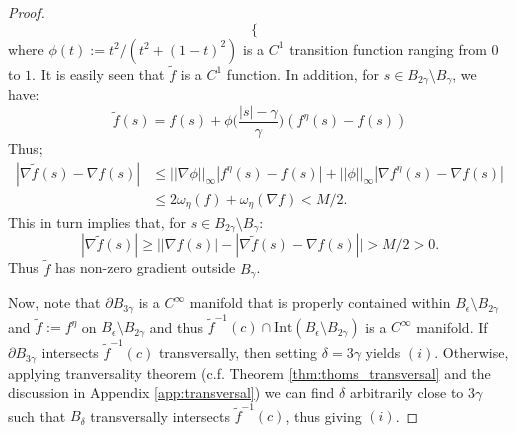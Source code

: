 \documentclass[11pt]{article}
\newcommand{\1}{\mathbf{1}}
\theoremstyle{definition}
\theoremstyle{remark}
\begin{document}
\begin{proof}
\begin{equation}
\begin{cases}
        \end{cases}        
    \end{equation}
    where $\phi(t):=t^2/(t^2+(1-t)^2)$ is a $C^1$ transition function ranging from $0$ to $1$. It is easily seen that $\tilde{f}$ is a $C^1$ function. In addition, for $s\in B_{2\gamma}\setminus B_{\gamma}$, we have:
    \begin{equation}\nonumber
        \tilde{f}(s) = f(s) + \phi\bigg(\frac{|s|-\gamma}{\gamma}\bigg)(f^\eta(s)-f(s)) 
    \end{equation}
    Thus;
    \begin{equation}\nonumber
    \begin{split}
        |\nabla \tilde{f}(s) - \nabla f(s)| & \leq ||\nabla \phi||_\infty|f^\eta(s)-f(s)|+||\phi||_\infty|\nabla f^\eta(s)-\nabla f(s)| \\ & \leq 2\omega_\eta(f) + \omega_\eta (\nabla f)<M/2.
    \end{split}
    \end{equation}
    This in turn implies that, for $s\in B_{2\gamma}\setminus B_{\gamma}$:
    \begin{equation}\nonumber
        |\nabla \tilde{f}(s)| \geq \bigg| |\nabla f(s)| - |\nabla \tilde{f}(s)-\nabla f(s)|\bigg| > M/2 > 0.
    \end{equation}
    Thus $\tilde{f}$ has non-zero gradient outside $B_\gamma$.
    
    Now, note that $\partial B_{3\gamma}$ is a $C^\infty$ manifold that is properly contained within $B_{\epsilon}\setminus B_{2\gamma}$ and $\tilde{f}:=f^\eta$ on $B_{\epsilon}\setminus B_{2\gamma}$ and thus $\tilde{f}^{-1}(c)\cap \text{Int}(B_{\epsilon}\setminus B_{2\gamma})$ is a $C^\infty$ manifold. If $\partial B_{3\gamma}$ intersects $\tilde{f}^{-1}(c)$ transversally, then setting $\delta=3\gamma$ yields $(i)$. Otherwise, applying tranversality theorem (c.f. Theorem \ref{thm:thoms_transversal} and the discussion in Appendix \ref{app:transversal}) we can find $\delta$ arbitrarily close to $3\gamma$ such that $B_{\delta}$ transversally intersects $\tilde{f}^{-1}(c)$, thus giving $(i)$.
    

\end{proof}
\end{document}

